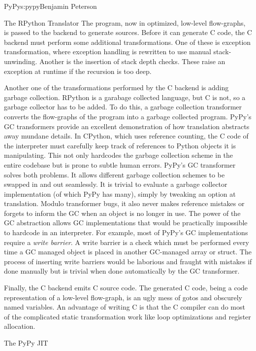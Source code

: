 \begin{aosachapter}{PyPy}{s:pypy}{Benjamin Peterson}
\begin{aosasect1}{The RPython Translator}
The program, now in optimized, low-level flow-graphs, is passed to the backend
to generate sources. Before it can generate C code, the C backend must perform
some additional transformations. One of these is exception transformation, where
exception handling is rewritten to use manual stack-unwinding. Another is the
insertion of stack depth checks. These raise an exception at runtime if the
recursion is too deep.

Another one of the transformations performed by the C backend is adding garbage
collection. RPython is a garabage collected language, but C is not, so a garbage
collector has to be added. To do this, a garbage collection transformer converts
the flow-graphs of the program into a garbage collected program. PyPy's GC
transformers provide an excellent demonstration of how translation abstracts
away mundane details. In CPython, which uses reference counting, the C code of
the interpreter must carefully keep track of references to Python objects it is
manipulating. This not only hardcodes the garbage collection scheme in the
entire codebase but is prone to subtle human errors. PyPy's GC transformer
solves both problems. It allows different garbage collection schemes to be
swapped in and out seamlessly. It is trivial to evaluate a garbage collector
implementation (of which PyPy has many), simply by tweaking an option at
translation. Modulo transformer bugs, it also never makes reference mistakes or
forgets to inform the GC when an object is no longer in use. The power of the GC
abstraction allows GC implementations that would be practically impossible to
hardcode in an interpreter. For example, most of PyPy's GC implementations
require a \emph{write barrier}. A write barrier is a check which must be
performed every time a GC managed object is placed in another GC-managed array
or struct. The process of inserting write barriers would be laborious and
fraught with mistakes if done manually but is trivial when done automatically by
the GC transformer.

Finally, the C backend emits C source code. The generated C code, being a code
representation of a low-level flow-graph, is an ugly mess of gotos and obscurely
named variables. An advantage of writing C is that the C compiler can do most of
the complicated static transformation work like loop optimizations and register
allocation.

\end{aosasect1}

\begin{aosasect1}{The PyPy JIT}
\label{sec:jit}


\end{aosasect1}
\end{aosachapter}
